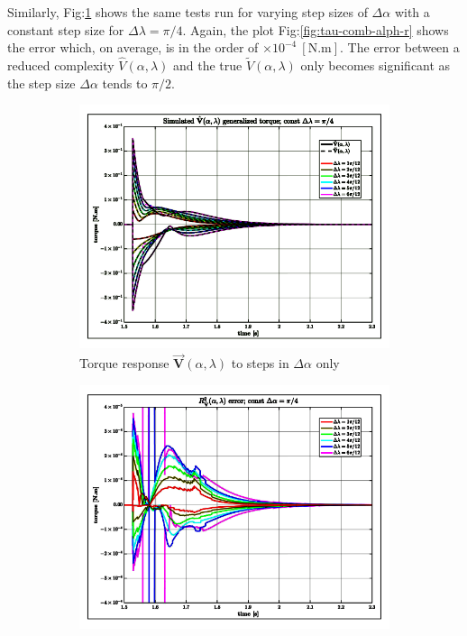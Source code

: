 \par
Similarly, Fig:\ref{fig:tau-comb-alph} shows the same tests run for varying step sizes of $\Delta\alpha$ with a constant step size for $\Delta\lambda=\pi/4$. Again, the plot Fig:\ref{fig:tau-comb-alph-r} shows the error which, on average, is in the order of $\times 10^{-4}~[\text{N.m}]$. The error between a reduced complexity $\hat{V}(\alpha,\lambda)$ and the true $\widetilde{V}(\alpha,\lambda)$ only becomes significant as the step size $\Delta\alpha$ tends to $\pi/2$.
\begin{figure}[htbp]
\vspace{-10pt}
\centering
\begin{subfigure}{0.49\textwidth}
\centering
\includegraphics[width=\textwidth]{graphs/tau-comb-alph}
\caption{Torque response $\vec{\mathbf{V}}(\alpha,\lambda)$ to steps in $\Delta\alpha$ only}
\label{fig:tau-comb-alph}
\end{subfigure}
\begin{subfigure}{0.49\textwidth}
\centering
\includegraphics[width=\textwidth]{graphs/tau-comb-alph-r}

\end{subfigure}
\end{figure}
